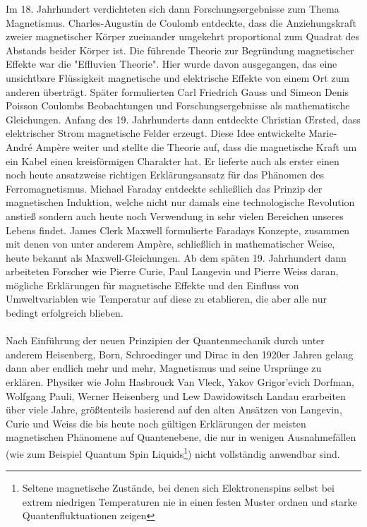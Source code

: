 \documentclass[12pt, a4paper]{article}
\begin{document}
Im 18. Jahrhundert verdichteten sich dann Forschungsergebnisse zum Thema Magnetismus. Charles-Augustin de Coulomb entdeckte, dass die Anziehungskraft zweier magnetischer Körper zueinander umgekehrt proportional zum Quadrat des Abstands beider Körper ist\cite{metioui22}.\newline
Die führende Theorie zur Begründung magnetischer Effekte war die "{Effluvien Theorie}". Hier wurde davon ausgegangen, das eine unsichtbare Flüssigkeit magnetische und elektrische Effekte von einem Ort zum anderen überträgt\cite{singh19}.\newline
Später formulierten Carl Friedrich Gauss und Simeon Denis Poisson Coulombs Beobachtungen und Forschungsergebnisse als mathematische Gleichungen. Anfang des 19. Jahrhunderts dann entdeckte Christian Œrsted, dass elektrischer Strom magnetische Felder erzeugt. Diese Idee entwickelte Marie-André Ampère weiter und stellte die Theorie auf, dass die magnetische Kraft um ein Kabel einen kreisförmigen Charakter hat. Er lieferte auch als erster einen noch heute ansatzweise richtigen Erklärungsansatz für das Phänomen des Ferromagnetismus\cite{singh19}.\newline 
Michael Faraday entdeckte schließlich das Prinzip der magnetischen Induktion, welche nicht nur damals eine technologische Revolution anstieß\cite{singh19} sondern auch heute noch Verwendung in sehr vielen Bereichen unseres Lebens findet.\newline 
James Clerk Maxwell formulierte Faradays Konzepte, zusammen mit denen von unter anderem Ampère, schließlich in mathematischer Weise\cite{singh19}, heute bekannt als Maxwell-Gleichungen.\newline 
Ab dem späten 19. Jahrhundert dann arbeiteten Forscher wie Pierre Curie, Paul Langevin und Pierre Weiss daran, mögliche Erklärungen für magnetische Effekte und den Einfluss von Umweltvariablen wie Temperatur auf diese zu etablieren, die aber alle nur bedingt erfolgreich blieben\cite{singh19}.\paragraph{}

Nach Einführung der neuen Prinzipien der Quantenmechanik durch unter anderem Heisenberg, Born, Schroedinger und Dirac in den 1920er Jahren gelang dann aber endlich mehr und mehr, Magnetismus und seine Ursprünge zu erklären.\newline
Physiker wie John Hasbrouck Van Vleck, Yakov Grigor’evich Dorfman, Wolfgang Pauli, Werner Heisenberg und Lew Dawidowitsch Landau erarbeiten über viele Jahre, größtenteils basierend auf den alten Ansätzen von Langevin, Curie und Weiss die bis heute noch gültigen Erklärungen der meisten magnetischen Phänomene auf Quantenebene, die nur in wenigen Ausnahmefällen (wie zum Beispiel Quantum Spin Liquids\footnote{Seltene magnetische Zustände, bei denen sich Elektronenspins selbst bei extrem niedrigen Temperaturen nie in einen festen Muster ordnen und starke Quantenfluktuationen zeigen}) nicht vollständig anwendbar sind\cite{singh19}.\newline 
\end{document}
